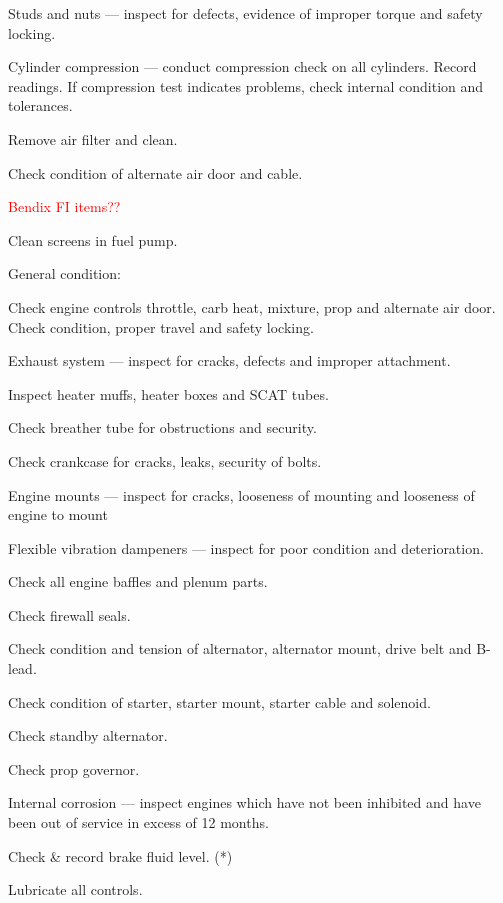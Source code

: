 \begin{enumerate*}
\begin{enumerate*}
		\item Studs and nuts --- inspect for defects, evidence of improper torque and safety locking.
  	\item Cylinder compression --- conduct compression check on all cylinders.  Record readings.  If compression test indicates problems, check internal condition and tolerances.
		\item Remove air filter and clean. 
		\item Check condition of alternate air door and cable.
		\item \textcolor{red}{Bendix FI items??} 
		\item Clean screens in fuel pump. 
		\item General condition:
		\begin{enumerate*}
		\item Check engine controls throttle, carb heat, mixture, prop and alternate air door.  Check condition, proper travel and safety locking.
		\item Exhaust system --- inspect for cracks, defects and improper attachment.
		\item Inspect heater muffs, heater boxes and SCAT tubes.
		\item Check breather tube for obstructions and security.
		\item Check crankcase for cracks, leaks, security of bolts.
		\item Engine mounts --- inspect for cracks, looseness of mounting and looseness of engine to mount
		\item Flexible vibration dampeners --- inspect for poor condition and deterioration.
		\item Check all engine baffles and plenum parts.
		\item Check firewall seals.
		\item Check condition and tension of alternator, alternator mount, drive belt and B-lead.
		\item Check condition of starter, starter mount, starter cable and solenoid.
		\item Check standby alternator.
		\item Check prop governor.
		\item Internal corrosion --- inspect engines which have not been inhibited and have been out of service in excess of 12 months.
	  \end{enumerate*}
		\item Check \& record brake fluid level.  (*)
		\item Lubricate all controls.

\end{enumerate*}
\end{enumerate*}
